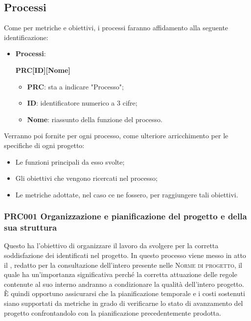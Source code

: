 \documentclass[../piano-di-qualifica.tex]{subfiles}
\begin{document}
\subsection{Processi}%
\label{sub:processi}
Come per metriche e obiettivi, i processi faranno affidamento alla seguente identificazione:
\begin{itemize}
    \item \textbf{Processi}: 
    \begin{center}
        \centering
        \textbf{PRC[ID][Nome]}
    \end{center}
    \begin{itemize}
        \item \textbf{PRC}: sta a indicare "Processo";
        \item \textbf{ID}: identificatore numerico a 3 cifre;
        \item \textbf{Nome}: riassunto della funzione del processo.
    \end{itemize}
\end{itemize}
Verranno poi fornite per ogni processo, come ulteriore arricchimento per le specifiche di ogni progetto:
\begin{itemize}
    \item Le funzioni principali da esso svolte;
    \item Gli obiettivi che vengono ricercati nel processo;
    \item Le metriche adottate, nel caso ce ne fossero, per raggiungere tali obiettivi.
\end{itemize}

\subsubsection{PRC001 Organizzazione e pianificazione del progetto e della sua struttura}%
\label{sub:organizzazione_e_pianificazione_del_progetto_e_della_sua_struttura}
Questo  ha l'obiettivo di organizzare il lavoro da svolgere per la corretta soddisfazione dei  identificati nel progetto.
In questo processo viene messo in atto il , redatto per la consultazione dell'intero  presente nelle \textsc{Norme di progetto}, il quale ha un'importanza significativa perché la corretta attuazione delle regole contenute al suo interno andranno a condizionare la qualità dell'intero progetto.
È quindi opportuno assicurarsi che la pianificazione temporale e i costi sostenuti siano supportati da metriche in grado di verificarne lo stato di avanzamento del progetto confrontandolo con la pianificazione precedentemente prodotta.
\end{document}
